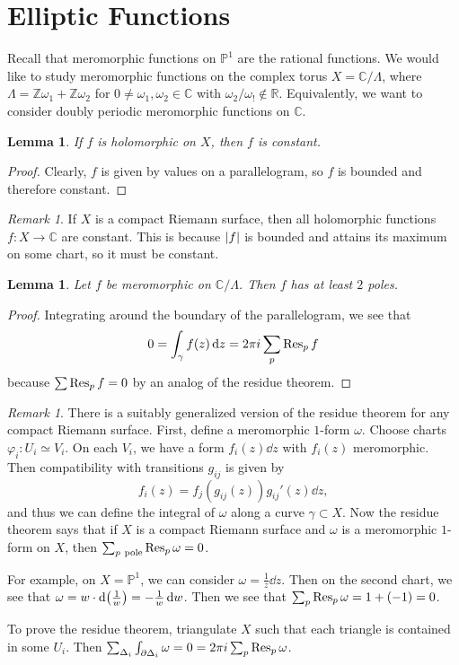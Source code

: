 \documentclass[leqno, openany]{memoir}
\newtheorem{lem}[thm]{Lemma}
\theoremstyle{definition}
\theoremstyle{remark}
\newtheorem{rmk}[thm]{Remark}
\theoremstyle{plain}
\theoremstyle{definition}
\theoremstyle{remark}
\newcommand{\R}{\mathbb{R}}
\newcommand{\C}{\mathbb{C}}
\newcommand{\Z}{\mathbb{Z}}
\renewcommand{\P}{\mathbb{P}}
\begin{document}
\section{Elliptic Functions}%

Recall that meromorphic functions on $\P^1$ are the rational functions. We
would like to study meromorphic functions on the complex torus $X =
\C/\Lambda$, where $\Lambda = \Z \omega_1 + \Z \omega_2$ for $0 \neq \omega_1,
\omega_2 \in \C$ with $\omega_2 / \omega_! \notin \R$. Equivalently, we want to
consider doubly periodic meromorphic functions on $\C$.

\begin{lem} If $f$ is holomorphic on $X$, then $f$ is constant.  \end{lem}

\begin{proof} Clearly, $f$ is given by values on a parallelogram, so $f$ is
bounded and therefore constant.  \end{proof}

\begin{rmk} If $X$ is a compact Riemann surface, then all holomorphic functions
$f \colon X \to \C$ are constant. This is because $\abs{f}$ is bounded and
attains its maximum on some chart, so it must be constant.  \end{rmk}

\begin{lem} Let $f$ be meromorphic on $\C / \Lambda$. Then $f$ has at least $2$
poles.  \end{lem}

\begin{proof} Integrating around the boundary of the parallelogram, we see that
    \[ 0 = \int_{\gamma} f(z) \dd{z} = 2 \pi i \sum_{p} \Res_p f \] because
$\sum \Res_p f = 0$ by an analog of the residue theorem.  \end{proof}

\begin{rmk} There is a suitably generalized version of the residue theorem for
    any compact Riemann surface. First, define a meromorphic $1$-form $\omega$.
    Choose charts $\varphi_i \colon U_i \simeq V_i$. On each $V_i$, we have a
    form $f_i(z) \dd{z}$ with $f_i(z)$ meromorphic. Then compatibility with
    transitions $g_{ij}$ is given by \[ f_i(z) = f_j(g_{ij}(z)) g_{ij}'(z)
    \dd{z}, \] and thus we can define the integral of $\omega$ along a curve
    $\gamma \subset X$. Now the residue theorem says that if $X$ is a compact
    Riemann surface and $\omega$ is a meromorphic $1$-form on $X$, then
    $\sum_{p\ \text{pole}} \Res_p \omega = 0$.

    For example, on $X = \P^1$, we can consider $\omega = \frac{1}{z} \dd{z}$.
    Then on the second chart, we see that $\omega = w \cdot
    \dd\qty(\frac{1}{w}) = -\frac{1}{w} \dd{w}$. Then we see that $\sum_p
    \Res_p \omega = 1 + (-1) = 0$.

    To prove the residue theorem, triangulate $X$ such that each triangle is
contained in some $U_i$. Then $\sum_{\Delta_i} \int_{\partial \Delta_i} \omega
= 0 = 2 \pi i \sum_p \Res_p \omega$.  \end{rmk}
\end{document}
